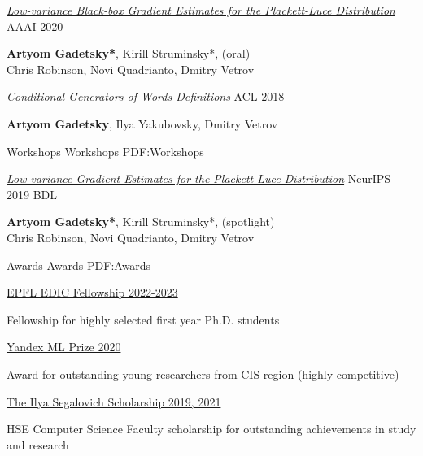 \documentclass[letterpaper,MMMyyyy,nonstopmode]{simpleresumecv}
\begin{document}
\begin{Body}
\Entry
\href{https://ojs.aaai.org/index.php/AAAI/article/view/6572}{\textit{Low-variance Black-box Gradient Estimates for the Plackett-Luce Distribution}} \hfill AAAI 2020
\begin{Detail}
\textbf{Artyom Gadetsky*}, Kirill Struminsky*, \hfill(oral) \\ Chris Robinson, Novi Quadrianto, Dmitry Vetrov
\end{Detail}
\Gap

\Entry
\href{https://aclanthology.org/P18-2043/}{\textit{Conditional Generators of Words Definitions}} \hfill ACL 2018
\begin{Detail}
\textbf{Artyom Gadetsky}, Ilya Yakubovsky, Dmitry Vetrov
\end{Detail}
\BigGap

\SubSection
{Workshops}
{Workshops}
{PDF:Workshops}
\Gap

\Entry
\href{http://bayesiandeeplearning.org/2019/}{\textit{Low-variance Gradient Estimates for the Plackett-Luce Distribution}} \hfill NeurIPS 2019 BDL
\begin{Detail}
\textbf{Artyom Gadetsky*}, Kirill Struminsky*, \hfill (spotlight) \\ Chris Robinson, Novi Quadrianto, Dmitry Vetrov
\end{Detail}

\Section
{Awards}
{Awards}
{PDF:Awards}

\Entry
\href{https://www.epfl.ch/education/phd/edic-computer-and-communication-sciences/edic-for-phd-students/}{EPFL EDIC Fellowship 2022-2023}
\begin{Detail}
Fellowship for highly selected first year Ph.D. students
\end{Detail}
\Gap

\Entry
\href{https://yandex.com/scholarships/}{Yandex ML Prize 2020}
\begin{Detail}
Award for outstanding young researchers from CIS region (highly competitive)
\end{Detail}
\Gap

\Entry
\href{https://cs.hse.ru/en/stipend/}{The Ilya Segalovich Scholarship 2019, 2021}
\begin{Detail}
HSE Computer Science Faculty scholarship for outstanding achievements in study and research
\end{Detail}
\Gap


\end{Body}
\end{document}
